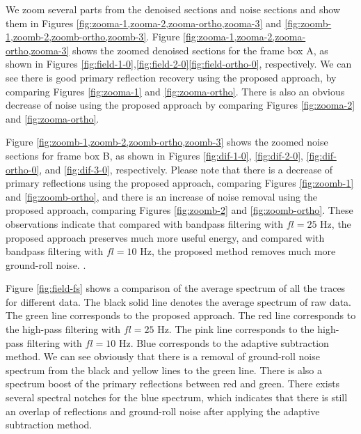 We zoom several parts from the denoised sections and noise sections and show them in Figures \ref{fig:zooma-1,zooma-2,zooma-ortho,zooma-3} and \ref{fig:zoomb-1,zoomb-2,zoomb-ortho,zoomb-3}. Figure \ref{fig:zooma-1,zooma-2,zooma-ortho,zooma-3} shows the zoomed denoised sections for the frame box A, as shown in Figures \ref{fig:field-1-0},\ref{fig:field-2-0}\new{, }\ref{fig:field-ortho-0},  respectively. We can see there is good primary reflection recovery using the proposed approach, by comparing Figures \ref{fig:zooma-1} and \ref{fig:zooma-ortho}. There is also an obvious decrease of noise using the proposed approach by comparing Figures \ref{fig:zooma-2} and \ref{fig:zooma-ortho}. 

Figure \ref{fig:zoomb-1,zoomb-2,zoomb-ortho,zoomb-3} shows the zoomed noise sections for frame box B, as shown in Figures \ref{fig:dif-1-0}, \ref{fig:dif-2-0},  \ref{fig:dif-ortho-0}, and \ref{fig:dif-3-0}, respectively. Please note that there is a decrease of primary reflections using the proposed approach, comparing Figures \ref{fig:zoomb-1} and \ref{fig:zoomb-ortho}, and there is an increase of noise removal using the proposed approach, comparing Figures \ref{fig:zoomb-2} and \ref{fig:zoomb-ortho}.  These observations indicate that compared with bandpass filtering with $fl=25$ Hz, the proposed approach preserves much more useful energy, and compared with bandpass filtering with $fl=10$ Hz, the proposed method removes much more ground-roll noise. .

Figure \ref{fig:field-fs} shows a comparison of the average spectrum of all the traces for different data. The black solid line denotes the average spectrum of raw data. The green line corresponds to the proposed approach. The red line corresponds to the high-pass filtering with $fl=25$ Hz. The pink line corresponds to the high-pass filtering with $fl=10$ Hz. Blue corresponds to the adaptive subtraction method. We can see obviously that there is a removal of ground-roll noise spectrum from the black and yellow lines to the green line.  There is also a spectrum boost of the primary reflections between red and green. There exists several spectral notches for the blue spectrum, which indicates that there is still an overlap of reflections and ground-roll noise after applying the adaptive subtraction method.

